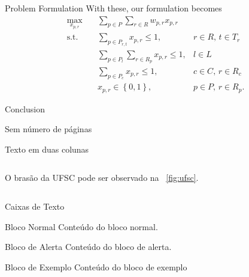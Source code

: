 \documentclass{beamer}
\begin{document}
\begin{frame}{Problem Formulation}
    With these, our formulation becomes
    \begin{align*}
        \max_{x_{p,r}} \quad & \sum_{p \in P} \sum_{r\in R} w_{p,r}x_{p,r} \\
	\textrm{s.t.} \quad & \sum_{p \in P_{r,t}} x_{p,r} \le 1, & r\in R,\,t\in T_r \\
			    & \sum_{p \in P_l} \sum_{r \in R_p} x_{p,r} \le 1, & l \in L \\
			    & \sum_{p \in P_c} x_{p,r} \le 1, & c \in C,\, r \in R_c \\
			    & x_{p,r} \in \left\{ 0,1 \right\}, & p \in P,\, r\in R_p
    .\end{align*}
\end{frame}


\begin{frame}{Conclusion}
    
\end{frame}


\begin{frame}[plain]{Sem número de páginas}
\lipsum[1]
\end{frame}



\begin{frame}{Texto em duas colunas}
  \begin{columns}[c]
    \begin{column}{.5\textwidth}

	O brasão da UFSC pode ser observado na \figurename~\ref{fig:ufsc}.

    \end{column}
    \begin{column}{.5\textwidth}


    \end{column}
  \end{columns}
\end{frame}


\begin{frame}{Caixas de Texto}

\begin{block}{Bloco Normal}
Conteúdo do bloco normal.
\end{block}

\begin{alertblock}{Bloco de Alerta}
Conteúdo do bloco de alerta.
\end{alertblock}

\begin{exampleblock}{Bloco de Exemplo}
Conteúdo do bloco de exemplo
\end{exampleblock}

\end{frame}
\end{document}
